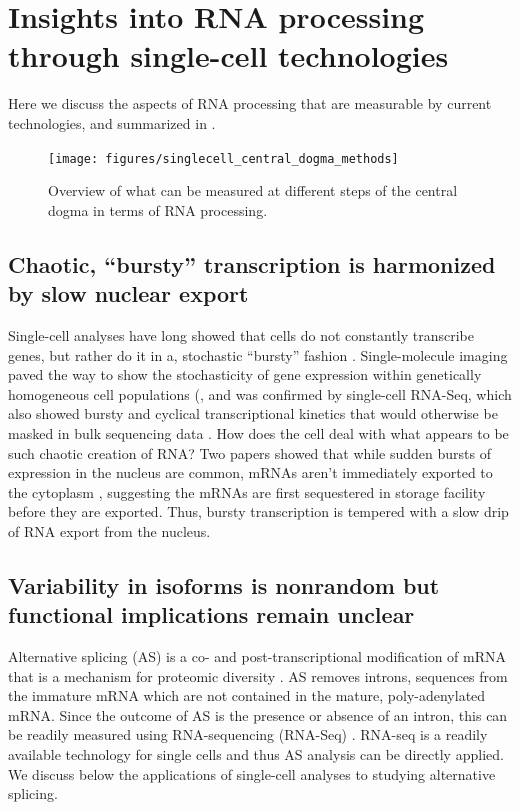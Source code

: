 \section{Insights into RNA processing through single-cell technologies}

Here we discuss the aspects of RNA processing that are measurable by current technologies, and summarized in .

\begin{figure}[h]
  \centering
  \texttt{[image: figures/singlecell\_central\_dogma\_methods]}
  \caption{Overview of what can be measured at different steps of the central dogma in terms of RNA processing.}
\label{fig:singlecell_central_dogma_methods}
\end{figure}

\subsection{Chaotic, ``bursty'' transcription is harmonized by slow nuclear export}

Single-cell analyses have long showed that cells do not constantly transcribe genes, but rather do it in a, stochastic ``bursty'' fashion  \cite{Kaern2005-ca,Kaufmann2007-nh,Raj2008-er,Raj2006-vi}. Single-molecule imaging paved the way to show the stochasticity of gene expression within genetically homogeneous cell populations \cite{Raj2006-vi,Vargas2011-iq} (, and was confirmed by single-cell RNA-Seq, which also showed bursty and cyclical transcriptional kinetics that would otherwise be masked in bulk sequencing data  \cite{Buettner2015-mj,Livak2013-nv,Shalek2013-ez}. How does the cell deal with what appears to be such chaotic creation of RNA? Two papers showed that while sudden bursts of expression in the nucleus are common, mRNAs aren't immediately exported to the cytoplasm  \cite{Bahar_Halpern2015-dq,Battich2015-df}, suggesting the mRNAs are first sequestered in storage facility before they are exported. Thus, bursty transcription is tempered with a slow drip of RNA export from the nucleus.


\subsection{Variability in isoforms is nonrandom but functional implications remain unclear}

Alternative splicing (AS) is a co- and post-transcriptional modification of mRNA that is a mechanism for proteomic diversity  \cite{Ameur2011-wf,Black2003-fz,Caceres2002-el,Day2016-ej,Kornblihtt2013-gm,Lee2015-vi}. AS removes introns, sequences from the immature mRNA which are not contained in the mature, poly-adenylated mRNA. Since the outcome of AS is the presence or absence of an intron, this can be readily measured using RNA-sequencing (RNA-Seq)  \cite{Wang2008-xh}. RNA-seq is a readily available technology for single cells and thus AS analysis can be directly applied. We discuss below the applications of single-cell analyses to studying alternative splicing.

